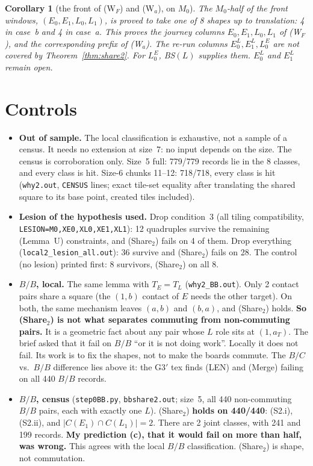 \documentclass[11pt]{article}
\newtheorem{corollary}[theorem]{Corollary}
\theoremstyle{definition}\newtheorem{definition}[theorem]{Definition}\newtheorem{remark}[theorem]{Remark}
\begin{document}
\begin{corollary}[the front of (W$_F$) and (W$_a$), on $M_0$]\label{cor:front}
The $M_0$-half of the front windows, $(E_0,E_1,L_0,L_1)$, is proved to take one of 8 shapes up to translation: 4 in case~b and 4 in case~a. This proves the journey columns $E_0,E_1,L_0,L_1$ of (W$_F$), and the corresponding prefix of (W$_a$). The re-run columns $E^L_0,E^L_1,L^E_0$ are not covered by Theorem~\ref{thm:share2}. For $L^E_0$, BS$(L)$ supplies them. $E^L_0$ and $E^L_1$ remain open.
\end{corollary}

\section{Controls}\label{sec:ctl}
\begin{itemize}
\item \textbf{Out of sample.} The local classification is exhaustive, not a sample of a census. It needs no extension at size~7: no input depends on the size. The census is corroboration only. Size~5 full: 779/779 records lie in the 8 classes, and every class is hit. Size-6 chunks 11--12: 718/718, every class is hit (\texttt{why2.out}, \texttt{CENSUS} lines; exact tile-set equality after translating the shared square to its base point, created tiles included).
\item \textbf{Lesion of the hypothesis used.} Drop condition~3 (all tiling compatibility, \texttt{LESION=M0,XE0,XL0,XE1,XL1}): 12 quadruples survive the remaining (Lemma~U) constraints, and (Share$_2$) fails on 4 of them. Drop everything (\texttt{local2\_lesion\_all.out}): 36 survive and (Share$_2$) fails on 28. The control (no lesion) printed first: 8 survivors, (Share$_2$) on all 8.
\item \textbf{$B/B$, local.} The same lemma with $T_E=T_L$ (\texttt{why2\_BB.out}). Only 2 contact pairs share a square (the $(1,b)$ contact of $E$ needs the other target). On both, the same mechanism leaves $(a,b)$ and $(b,a)$, and (Share$_2$) holds. \textbf{So (Share$_2$) is not what separates commuting from non-commuting pairs.} It is a geometric fact about any pair whose $L$ role sits at $(1,a_T)$. The brief asked that it fail on $B/B$ ``or it is not doing work''. Locally it does not fail. Its work is to fix the shapes, not to make the boards commute. The $B/C$ vs.\ $B/B$ difference lies above it: the G3$'$ tex finds (LEN) and (Merge) failing on all 440 $B/B$ records.
\item \textbf{$B/B$, census} (\texttt{step0BB.py}, \texttt{bbshare2.out}; size~5, all 440 non-commuting $B/B$ pairs, each with exactly one $L$). (Share$_2$) \textbf{holds on 440/440}: (S2.i), (S2.ii), and $|C(E_1)\cap C(L_1)|=2$. There are 2 joint classes, with 241 and 199 records. \textbf{My prediction (c), that it would fail on more than half, was wrong.} This agrees with the local $B/B$ classification. (Share$_2$) is shape, not commutation.
\end{itemize}
\end{document}
